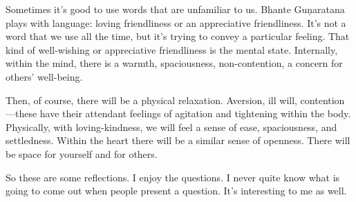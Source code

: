 Sometimes it’s good to use words that are unfamiliar to us. Bhante
Guṇaratana plays with language: loving friendliness or an appreciative
friendliness. It’s not a word that we use all the time, but it’s trying
to convey a particular feeling. That kind of well-wishing or
appreciative friendliness is the mental state. Internally, within the
mind, there is a warmth, spaciousness, non-contention, a concern for
others’ well-being.

Then, of course, there will be a physical relaxation. Aversion, ill
will, contention—these have their attendant feelings of agitation and
tightening within the body. Physically, with loving-kindness, we will
feel a sense of ease, spaciousness, and settledness. Within the heart
there will be a similar sense of openness. There will be space for
yourself and for others.

So these are some reflections. I enjoy the questions. I never quite know
what is going to come out when people present a question. It’s
interesting to me as well.

